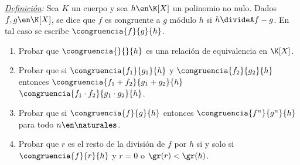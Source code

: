 \begin{enunciado}{\ejercicio}

\textit{\underline {Definición}:} Sea $K$ un cuerpo y sea $h \en \K[X]$ un polinomio no nulo. Dados $f,g \en \K[X]$,
se dice que $f$ es congruente a $g$ módulo $h$ si $h \divideA f-g$. En tal caso se escribe $\congruencia{f}{g}{h}$.

\begin{enumerate}[label=\roman*)]
	\item Probar que $\congruencia{}{}{h}$ es una relación de equivalencia en $\K[X]$.

	\item Probar que si
	      $\congruencia{f_1}{g_1}{h}$ y
	      $\congruencia{f_2}{g_2}{h}$
	      entonces
	      $\congruencia{f_1 + f_2}{g_1 + g_2}{h}$
	      $\congruencia{f_1 \cdot f_2}{ g_1 \cdot g_2}{h}$.

	\item Probar que si $\congruencia{f}{g}{h}$ entonces $\congruencia{f^n}{g^n}{h}$ para todo $n \en \naturales$.

	\item Probar que $r$ es el resto de la división de $f$ por $h$ si y solo si $\congruencia{f}{r}{h}$ y $r=0$ o $\gr(r) < \gr(h)$.
\end{enumerate}

\end{enunciado}

